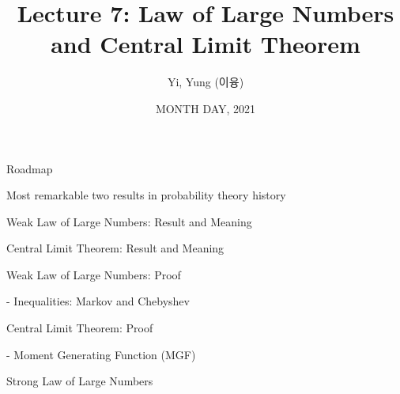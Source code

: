 

\csname\pdfmode\endcsname



\title[]{Lecture 7: Law of Large Numbers and Central Limit Theorem}
\author{Yi, Yung (이융)}
\date{MONTH DAY, 2021}








\begin{frame}
  \titlepage
\end{frame}





\begin{frame}{Roadmap}

\plitemsep 0.1in

\bci 
\item Most remarkable two results in probability theory history

\bigskip

\item Weak Law of Large Numbers: Result and Meaning
\item Central Limit Theorem: Result and Meaning
\item Weak Law of Large Numbers: Proof

- Inequalities: Markov and Chebyshev

\item Central Limit Theorem: Proof

- Moment Generating Function (MGF)

\item Strong Law of Large Numbers
\eci 

\end{frame}

